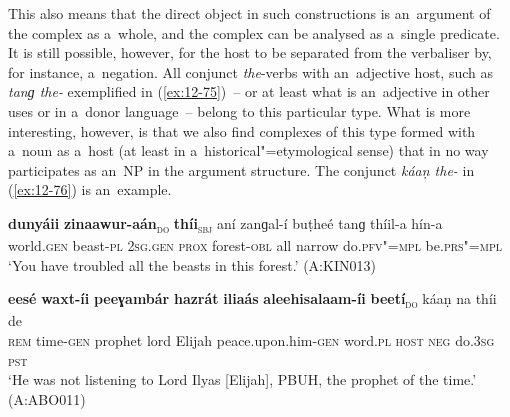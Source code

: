 This also means that the direct object in such constructions is an~argument of the complex as a~whole, and the complex can be analysed as a~single predicate. It is still possible, however, for the host to be separated from the verbaliser by, for instance, a~negation. All conjunct \textit{the}-verbs with an~adjective host, such as \textit{tanɡ the-} exemplified in (\ref{ex:12-75})~-- or at least what is an~adjective in other uses or in a~donor language~-- belong to this particular type. What is more interesting, however, is that we also find complexes of this type formed with a~noun as a~host (at least in a~historical"=etymological sense) that in no way participates as an~NP in the argument structure. The conjunct \textit{káaṇ the-} in (\ref{ex:12-76}) is an~example. 
\begin{exe}
\ex
\label{ex:12-75}
\gll {\ob}\textbf{dunyáii} \textbf{zinaawur-aán}{\cb}\textsubscript{\textsc{\upshape do}} {\ob}\textbf{thíi}{\cb}\textsubscript{\textsc{\upshape sbj}} aní zanɡal-í buṭheé tanɡ thíil-a hín-a\\
world.\textsc{gen} beast-\textsc{pl} \textsc{2sg.gen} \textsc{prox} forest-\textsc{obl} all  narrow do.\textsc{pfv"=mpl} be.\textsc{prs"=mpl}\\
\glt `You have troubled all the beasts in this forest.' (A:KIN013)

\ex
\label{ex:12-76}
\gll {\ob}\textbf{eesé} \textbf{waxt-íi} \textbf{peeɣambár} \textbf{hazrát} \textbf{iliaás} \textbf{aleehisalaam-íi} \textbf{ beetí}{\cb}\textsubscript{\textsc{\upshape do}} káaṇ na thíi de\\
\textsc{rem} time-\textsc{gen} prophet lord Elijah peace.upon.him-\textsc{gen} word.\textsc{pl} \textsc{host} \textsc{neg} do.\textsc{3sg} \textsc{pst}\\
\glt `He was not listening to Lord Ilyas [Elijah], PBUH, the prophet of the time.' (A:ABO011)
\end{exe}

